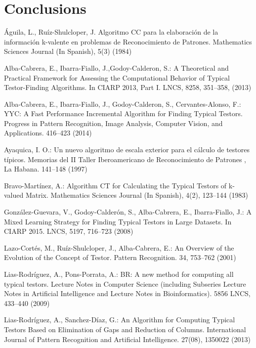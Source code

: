 \documentclass[citeauthoryear]{llncs}
\begin{document}
\section{Conclusions}
%
%
\begin{thebibliography}{}
%


	Águila, L., Ruíz-Shulcloper, J.  
	Algoritmo CC para la elaboración de la información k-valente en problemas de Reconocimiento de Patrones. 
	Mathematics Sciences Journal (In Spanish), 
	5(3) (1984)
	
	Alba-Cabrera, E., Ibarra-Fiallo, J.,Godoy-Calderon, S.:
	A Theoretical and Practical Framework for Assessing the Computational Behavior of Typical Testor-Finding Algorithms.
	In CIARP 2013, Part I. LNCS,
	8258, 351--358, (2013)
	
	Alba-Cabrera, E., Ibarra-Fiallo, J., Godoy-Calderon, S., Cervantes-Alonso, F.:
	YYC: A Fast Performance Incremental Algorithm for Finding Typical Testors.
	Progress in Pattern Recognition, Image Analysis, Computer Vision, and Applications.
	416--423 (2014)
	
	Ayaquica, I. O.:
	Un nuevo algoritmo de escala exterior para el c\'alculo de testores t\'ipicos.
	Memorias del II Taller Iberoamericano de Reconocimiento de Patrones , La
	Habana. 141--148 (1997)
	
	Bravo-Martínez, A.:
	Algorithm CT for Calculating the Typical Testors of k-valued Matrix. 
	Mathematics Sciences Journal (In Spanish), 
	4(2), 123--144 (1983)
	
	González-Guevara, V., Godoy-Calderón, S., Alba-Cabrera, E.,  Ibarra-Fiallo, J.:
	A Mixed Learning Strategy for Finding Typical Testors in Large Datasets. 
	In CIARP 2015. LNCS,
	5197, 716--723 (2008)
		
	Lazo-Cort\'es, M., Ruíz-Shulcloper, J., Alba-Cabrera, E.:
	An Overview of the Evolution of the Concept of Testor. 
	Pattern Recognition. 34, 753--762 (2001)

	Lias-Rodr\'iguez, A., Pons-Porrata, A.:
	BR: A new method for computing all typical testors. 
	Lecture Notes in Computer Science (including Subseries Lecture Notes 
	in Artificial Intelligence and Lecture Notes in Bioinformatics).
	5856 LNCS, 433--440 (2009)

	Lias-Rodr\'iguez, A., Sanchez-D\'iaz, G.:
 	An Algorithm for Computing Typical Testors Based on Elimination of Gaps and Reduction of Columns.
 	International Journal of Pattern Recognition and Artificial Intelligence. 27(08), 1350022 (2013)


\end{thebibliography}
\end{document}
